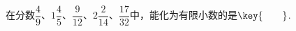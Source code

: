 在分数$\dfrac {4}{9}$、$1\dfrac {4}{5}$、$\dfrac {9}{12}$、$2\dfrac {2}{14}$、$\dfrac {17}{32}$中，能化为有限小数的是$\key{\qquad}$.